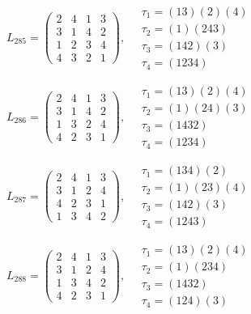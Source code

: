 $L_{285} = \begin{pmatrix} 2 & 4 & 1 & 3 \\ 3 & 1 & 4 & 2 \\ 1 & 2 & 3 & 4 \\ 4 & 3 & 2 & 1 \end{pmatrix}, \quad \begin{matrix} \tau_{1} = (1 3)(2)(4) \\ \tau_{2} = (1)(2 4 3) \\ \tau_{3} = (1 4 2)(3) \\ \tau_{4} = (1 2 3 4) \end{matrix}$

$L_{286} = \begin{pmatrix} 2 & 4 & 1 & 3 \\ 3 & 1 & 4 & 2 \\ 1 & 3 & 2 & 4 \\ 4 & 2 & 3 & 1 \end{pmatrix}, \quad \begin{matrix} \tau_{1} = (1 3)(2)(4) \\ \tau_{2} = (1)(2 4)(3) \\ \tau_{3} = (1 4 3 2) \\ \tau_{4} = (1 2 3 4) \end{matrix}$

$L_{287} = \begin{pmatrix} 2 & 4 & 1 & 3 \\ 3 & 1 & 2 & 4 \\ 4 & 2 & 3 & 1 \\ 1 & 3 & 4 & 2 \end{pmatrix}, \quad \begin{matrix} \tau_{1} = (1 3 4)(2) \\ \tau_{2} = (1)(2 3)(4) \\ \tau_{3} = (1 4 2)(3) \\ \tau_{4} = (1 2 4 3) \end{matrix}$

$L_{288} = \begin{pmatrix} 2 & 4 & 1 & 3 \\ 3 & 1 & 2 & 4 \\ 1 & 3 & 4 & 2 \\ 4 & 2 & 3 & 1 \end{pmatrix}, \quad \begin{matrix} \tau_{1} = (1 3)(2)(4) \\ \tau_{2} = (1)(2 3 4) \\ \tau_{3} = (1 4 3 2) \\ \tau_{4} = (1 2 4)(3) \end{matrix}$

